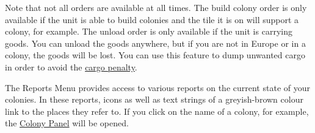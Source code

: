 \documentclass[12pt]{article}
\begin{document}
Note that not all orders are available at all times. The build colony
order is only available if the unit is able to build colonies and the
tile it is on will support a colony, for example. The unload order is
only available if the unit is carrying goods. You can unload the goods
anywhere, but if you are not in Europe or in a colony, the goods will
be lost.  You can use this feature to dump unwanted cargo in order to avoid the \hyperlink{Cargo Penalty}{cargo
  penalty}.

The \hypertarget{reports menu}{Reports Menu} provides access to
various reports on the current state of your colonies. In these
reports, icons as well as text strings of a greyish-brown colour link
to the places they refer to. If you click on the name of a colony, for
example, the \hyperlink{colony panel}{Colony Panel} will be opened.
\end{document}
